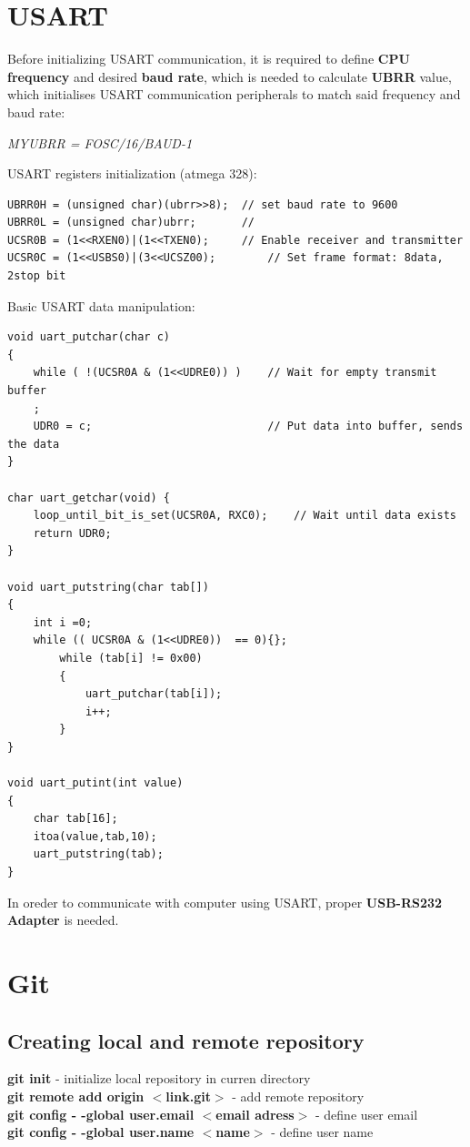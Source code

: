 \documentclass{article}
\begin{document}
\section{USART}
Before initializing USART communication, it is required to define \textbf{CPU frequency} and desired \textbf{baud rate}, which is needed to calculate \textbf{UBRR} value, which initialises USART communication peripherals to match said frequency and baud rate: 
\begin{center}
\textit{MYUBRR = FOSC/16/BAUD-1}
\end{center}
%
USART registers initialization (atmega 328):
\begin{verbatim}
UBRR0H = (unsigned char)(ubrr>>8);	// set baud rate to 9600
UBRR0L = (unsigned char)ubrr;		//
UCSR0B = (1<<RXEN0)|(1<<TXEN0);		// Enable receiver and transmitter 
UCSR0C = (1<<USBS0)|(3<<UCSZ00);		// Set frame format: 8data, 2stop bit
\end{verbatim}
%
Basic USART data manipulation:
\begin{verbatim}
void uart_putchar(char c) 
{
	while ( !(UCSR0A & (1<<UDRE0)) )	// Wait for empty transmit buffer 
	;
    UDR0 = c;							// Put data into buffer, sends the data 
}

char uart_getchar(void) {
    loop_until_bit_is_set(UCSR0A, RXC0); 	// Wait until data exists
    return UDR0;
}

void uart_putstring(char tab[])
{
	int i =0;
	while (( UCSR0A & (1<<UDRE0))  == 0){};
        while (tab[i] != 0x00)
		{ 
            uart_putchar(tab[i]);
			i++; 
        }
}

void uart_putint(int value)
{
	char tab[16];
	itoa(value,tab,10);
	uart_putstring(tab);
}
\end{verbatim}
%
In oreder to communicate with computer using USART, proper \textbf{USB-RS232 Adapter} is needed. 

\section{Git}
\subsection{Creating local and remote repository}
\textbf{git init} - initialize local repository in curren directory\\
\textbf{git remote add origin $<$link.git$>$} - add remote repository\\
\textbf{git config - -global user.email $<$email adress$>$} - define user email\\
\textbf{git config - -global user.name $<$name$>$} - define user name\\
\end{document}
